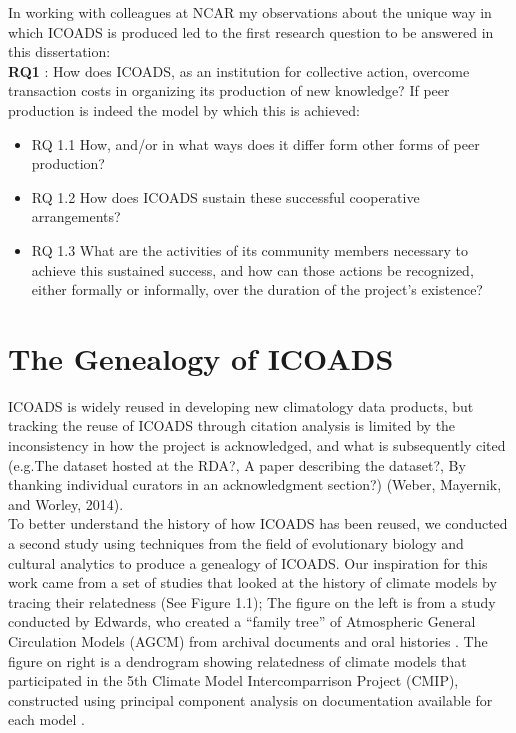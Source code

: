 \documentclass[thesis,tocnosub,noragright,centerchapter,12pt]{uiucecethesis09}
\begin{document}
In working with colleagues at NCAR my observations about the unique way
in which ICOADS is produced led to the first research question to be
answered in this dissertation:\\

\textbf{RQ1} : How does ICOADS, as an institution for collective action,
overcome transaction costs in organizing its production of new
knowledge? If peer production is indeed the model by which this is
achieved:

\begin{itemize}
\itemsep1pt\parskip0pt
\item[]
  RQ 1.1 How, and/or in what ways does it differ form other forms of
  peer production?
\item[]
  RQ 1.2 How does ICOADS sustain these successful cooperative
  arrangements?
\item[]
  RQ 1.3 What are the activities of its community members necessary to
  achieve this sustained success, and how can those actions be
  recognized, either formally or informally, over the duration of the
  project's existence?
\end{itemize}

\section{The Genealogy of ICOADS}

ICOADS is widely reused in developing new climatology data products, but
tracking the reuse of ICOADS through citation analysis is limited
by the inconsistency in how the project is acknowledged,  and what is subsequently cited (e.g.The dataset hosted at the RDA?, A
paper describing the dataset?, By thanking individual curators in an acknowledgment section?) (Weber, Mayernik, and Worley, 2014).\\

To better understand the history of how ICOADS has been reused, we conducted a second study using techniques from the field
of evolutionary biology \citep{page2009molecular} and cultural analytics \citep{mace2005phylogenetic} to produce a
genealogy of ICOADS. Our inspiration for this work came from a set of
studies that looked at the history of climate models by tracing their
relatedness (See Figure 1.1); The figure on the left is from a study
conducted by Edwards, who created a ``family tree'' of Atmospheric
General Circulation Models (AGCM) from archival documents and oral
histories \citeyearpar{edwards2010vast}. The figure on right is a dendrogram
showing relatedness of climate models that participated in the 5th
Climate Model Intercomparrison Project (CMIP), constructed using
principal component analysis on documentation available for each model
\citep{knutti2013climate}.\\
\end{document}
